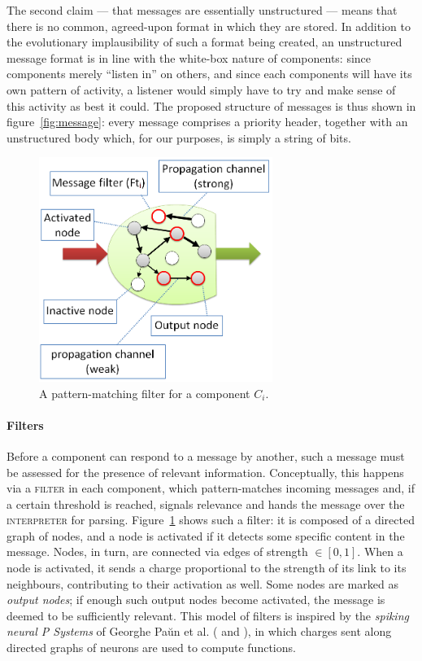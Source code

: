\documentclass[]{scrartcl}
\newcommand{\caps}[1]{\textsc{#1}}
\begin{document}
The second claim --- that messages are essentially unstructured --- means that there is no common, agreed-upon format in which they are stored. In addition to the evolutionary implausibility of such a format being created, an unstructured message format is in line with the white-box nature of components: since components merely ``listen in'' on others, and since each components will have its own pattern of activity, a listener would simply have to try and make sense of this activity as best it could. The proposed structure of messages is thus shown in figure~\ref{fig:message}: every message comprises a priority header, together with an unstructured body which, for our purposes, is simply a string of bits.

\begin{figure}[!h]
	\centering
	\includegraphics[width=215pt]{figs/filter.png}
	\caption{A pattern-matching filter for a component $C_i$.}
	\label{fig:filter}
\end{figure}

\paragraph{Filters} Before a component can respond to a message by another, such a message must be assessed for the presence of relevant information. Conceptually, this happens via a \caps{filter} in each component, which pattern-matches incoming messages and, if a certain threshold is reached, signals relevance and hands the message over the \caps{interpreter} for parsing. Figure~\ref{fig:filter} shows such a filter: it is composed of a directed graph of nodes, and a node is activated if it detects some specific content in the message. Nodes, in turn, are connected via edges of strength $\in [0,1]$. When a node is activated, it sends a charge proportional to the strength of its link to its neighbours, contributing to their activation as well. Some nodes are marked as {\em output nodes}; if enough such output nodes become activated, the message is deemed to be sufficiently relevant. This model of filters is inspired by the {\em spiking neural P Systems} of Georghe Pa\u{u}n et al. (\cite[p. 337]{membraneComputing} and \cite{spikingNeural}), in which charges sent along directed graphs of neurons are used to compute functions.
\end{document}
